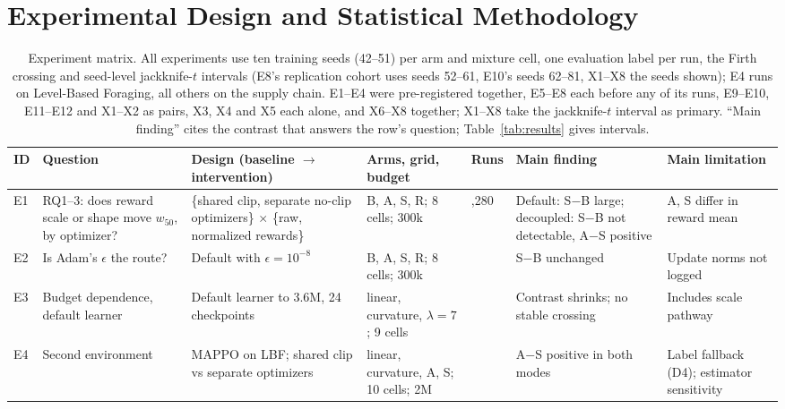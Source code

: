 
\section{Experimental Design and Statistical Methodology}
\label{sec:design}



\begin{table}[!htbp]
\caption{Experiment matrix. All experiments use ten training seeds (42--51) per arm and mixture cell, one evaluation label per run, the Firth crossing and seed-level jackknife-$t$ intervals (E8's replication cohort uses seeds 52--61, E10's seeds 62--81, X1--X8 the seeds shown); E4 runs on Level-Based Foraging, all others on the supply chain. E1--E4 were pre-registered together, E5--E8 each before any of its runs, E9--E10, E11--E12 and X1--X2 as pairs, X3, X4 and X5 each alone, and X6--X8 together; X1--X8 take the jackknife-$t$ interval as primary. ``Main finding'' cites the contrast that answers the row's question; Table~\ref{tab:results} gives intervals.}
\label{tab:matrix}
\centering\scriptsize\setlength{\tabcolsep}{3pt}
\begin{tabular}{@{}>{\raggedright\arraybackslash}p{}>{\raggedright\arraybackslash}p{}>{\raggedright\arraybackslash}p{}>{\raggedright\arraybackslash}p{}>{\raggedright\arraybackslash}p{}>{\raggedright\arraybackslash}p{}>{\raggedright\arraybackslash}p{}@{}}
\toprule
ID & Question & Design (baseline $\to$ intervention) & Arms, grid, budget & Runs & Main finding & Main limitation \\
\midrule
E1 & RQ1--3: does reward scale or shape move $w_{50}$, by optimizer? & \{shared clip, separate no-clip optimizers\} $\times$ \{raw, normalized rewards\} & B, A, S, R; 8 cells; 300k & 1,280 & Default: S$-$B large; decoupled: S$-$B not detectable, A$-$S positive & A, S differ in reward mean \\
E2 & Is Adam's $\epsilon$ the route? & Default with $\epsilon=10^{-8}$ & B, A, S, R; 8 cells; 300k & 320 & S$-$B unchanged & Update norms not logged \\
E3 & Budget dependence, default learner & Default learner to 3.6M, 24 checkpoints & linear, curvature, $\lambda=7$; 9 cells & 270 & Contrast shrinks; no stable crossing & Includes scale pathway \\
E4 & Second environment & MAPPO on LBF; shared clip vs separate optimizers & linear, curvature, A, S; 10 cells; 2M & 800 & A$-$S positive in both modes & Label fallback (D4); estimator sensitivity \\

\end{tabular}
\end{table}
